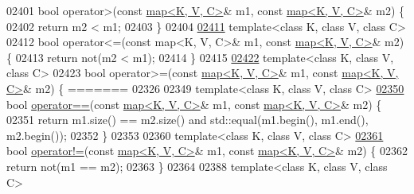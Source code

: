 \begin{DoxyCode}
02401 \textcolor{keywordtype}{bool} operator>(\textcolor{keyword}{const} \hyperlink{classaed2_1_1map}{map<K, V, C>}& m1, \textcolor{keyword}{const} \hyperlink{classaed2_1_1map}{map<K, V, C>}& m2) \{
02402     \textcolor{keywordflow}{return} m2 < m1;
02403 \}
02404 
\hypertarget{map3_8h_source_l02411}{}\hyperlink{classaed2_1_1map_afe374b37f17263d0cad3ee19a590d208_afe374b37f17263d0cad3ee19a590d208}{02411} \textcolor{keyword}{template}<\textcolor{keyword}{class} K, \textcolor{keyword}{class} V, \textcolor{keyword}{class} C>
02412 \textcolor{keywordtype}{bool} operator<=(const map<K, V, C>& m1, \textcolor{keyword}{const} \hyperlink{classaed2_1_1map}{map<K, V, C>}& m2) \{
02413     \textcolor{keywordflow}{return} not(m2 < m1);
02414 \}
02415 
\hypertarget{map3_8h_source_l02422}{}\hyperlink{classaed2_1_1map_a093a6d1a055339c5fc6297a1d47a9159_a093a6d1a055339c5fc6297a1d47a9159}{02422} \textcolor{keyword}{template}<\textcolor{keyword}{class} K, \textcolor{keyword}{class} V, \textcolor{keyword}{class} C>
02423 \textcolor{keywordtype}{bool} operator>=(\textcolor{keyword}{const} \hyperlink{classaed2_1_1map}{map<K, V, C>}& m1, \textcolor{keyword}{const} \hyperlink{classaed2_1_1map}{map<K, V, C>}& m2) \{
=======
02326 
02349 \textcolor{keyword}{template}<\textcolor{keyword}{class} K, \textcolor{keyword}{class} V, \textcolor{keyword}{class} C>
\hyperlink{classaed2_1_1map_abfc51b39670220e79037ac067006e933_abfc51b39670220e79037ac067006e933}{02350} \textcolor{keywordtype}{bool} \hyperlink{classaed2_1_1map_abfc51b39670220e79037ac067006e933_abfc51b39670220e79037ac067006e933}{operator==}(\textcolor{keyword}{const} \hyperlink{classaed2_1_1map}{map<K, V, C>}& m1, \textcolor{keyword}{const} \hyperlink{classaed2_1_1map}{map<K, V, C>}& m2) \{
02351     \textcolor{keywordflow}{return} m1.size() == m2.size() and std::equal(m1.begin(), m1.end(), m2.begin());
02352 \}
02353 
02360 \textcolor{keyword}{template}<\textcolor{keyword}{class} K, \textcolor{keyword}{class} V, \textcolor{keyword}{class} C>
\hyperlink{classaed2_1_1map_abce0fa35c5b25fd67111c2e704616f09_abce0fa35c5b25fd67111c2e704616f09}{02361} \textcolor{keywordtype}{bool} \hyperlink{classaed2_1_1map_abce0fa35c5b25fd67111c2e704616f09_abce0fa35c5b25fd67111c2e704616f09}{operator!=}(\textcolor{keyword}{const} \hyperlink{classaed2_1_1map}{map<K, V, C>}& m1, \textcolor{keyword}{const} \hyperlink{classaed2_1_1map}{map<K, V, C>}& m2) \{
02362     \textcolor{keywordflow}{return} not(m1 == m2);
02363 \}
02364 
02388 \textcolor{keyword}{template}<\textcolor{keyword}{class} K, \textcolor{keyword}{class} V, \textcolor{keyword}{class} C>

\end{DoxyCode}
